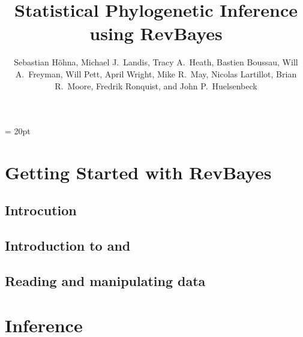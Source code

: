 \documentclass[11pt]{book}
\begin{document}
\renewcommand{\headrulewidth}{0.5pt}
\headsep = 20pt
\lhead{ }


\frontmatter

\title{\Huge \textbf{Statistical Phylogenetic Inference using RevBayes} }
\author{
Sebastian H{\"o}hna,
Michael J.~Landis,
Tracy A.~Heath,
Bastien Boussau,
Will A.~Freyman,
Will Pett,
April Wright,
Mike R.~May,
Nicolas Lartillot,
Brian R.~Moore,
Fredrik Ronquist, and
John P.~Huelsenbeck
}


\maketitle

\tableofcontents




\mainmatter

\def \GlobalResourcePath {./}

\part{Getting Started with RevBayes}

\chapter{Introcution}
\def \ResourcePath {RB_Getting_Started/}


\chapter{Introduction to \RevBayes and \Rev}
\def \ResourcePath {RB_Basics_Tutorial/}


\chapter{Reading and manipulating data}
\def \ResourcePath {RB_Data_Tutorial/}




\part{Inference}
\end{document}
